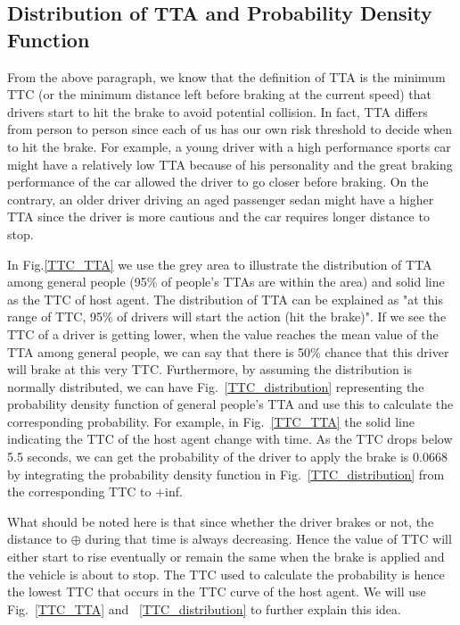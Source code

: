 \documentclass[twocolumn,10pt]{asme2e}
\begin{document}
\subsection{Distribution of TTA and Probability Density Function}

From the above paragraph, we know that the definition of TTA is the minimum TTC (or the minimum distance left before braking at the current speed) that drivers start to hit the brake to avoid potential collision. In fact, TTA differs from person to person since each of us has our own risk threshold to decide when to hit the brake. For example, a young driver with a high performance sports car might have a relatively low TTA because of his personality and the great braking performance of the car allowed the driver to go closer before braking. On the contrary, an older driver driving an aged passenger sedan might have a higher TTA since the driver is more cautious and the car requires longer distance to stop.

In Fig.\ref{TTC_TTA} we use the grey area to illustrate the distribution of TTA among general people (95\% of people's TTAs are within the area) and solid line as the TTC of host agent. The distribution of TTA can be explained as "at this range of TTC, 95\% of drivers will start the action (hit the brake)". If we see the TTC of a driver is getting lower, when the value reaches the mean value of the TTA among general people, we can say that there is 50\% chance that this driver will brake at this very TTC. Furthermore, by assuming the distribution is normally distributed, we can have Fig.~\ref{TTC_distribution} representing the probability density function of general people's TTA and use this to calculate the corresponding probability. For example, in Fig.~\ref{TTC_TTA} the solid line indicating the TTC of the host agent change with time. As the TTC drops below 5.5 seconds, we can get the probability of the driver to apply the brake is 0.0668 by integrating the probability density function in Fig.~\ref{TTC_distribution} from the corresponding TTC to +inf.

What should be noted here is that since whether the driver brakes or not, the distance to $\oplus$ during that time is always decreasing. Hence the value of TTC will either start to rise eventually or remain the same  when the brake is applied and the vehicle is about to stop. The TTC used to calculate the probability is hence the lowest TTC that occurs in the TTC curve of the host agent. We will use Fig.~\ref{TTC_TTA} and ~\ref{TTC_distribution} to further explain this idea. 
\end{document}
